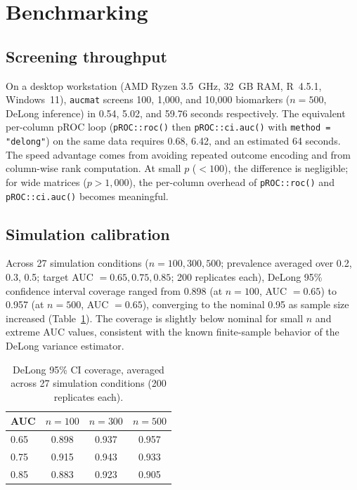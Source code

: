 \documentclass[11pt,a4paper]{article}
\begin{document}
\section{Benchmarking}

\subsection{Screening throughput}

On a desktop workstation (AMD Ryzen 3.5~GHz, 32~GB RAM, R~4.5.1,
Windows~11), \texttt{aucmat} screens 100, 1{,}000, and 10{,}000 biomarkers
($n = 500$, DeLong inference) in 0.54, 5.02, and 59.76 seconds respectively.
The equivalent per-column pROC loop (\texttt{pROC::roc()} then
\texttt{pROC::ci.auc()} with \texttt{method = "delong"}) on the same data
requires 0.68, 6.42, and an estimated 64 seconds.  The speed advantage comes
from avoiding repeated outcome encoding and from column-wise rank computation.
At small $p$ ($<100$), the difference is negligible; for wide matrices
($p > 1{,}000$), the per-column overhead of \texttt{pROC::roc()} and
\texttt{pROC::ci.auc()} becomes meaningful.

\subsection{Simulation calibration}

Across 27 simulation conditions ($n = 100, 300, 500$; prevalence averaged
over 0.2, 0.3, 0.5; target AUC $= 0.65, 0.75, 0.85$; 200 replicates each),
DeLong 95\% confidence interval coverage ranged from 0.898 (at $n = 100$,
AUC $= 0.65$) to 0.957 (at $n = 500$, AUC $= 0.65$), converging to the
nominal 0.95 as sample size increased (Table~\ref{tab:coverage}).  The
coverage is slightly below nominal for small $n$ and extreme AUC values,
consistent with the known finite-sample behavior of the DeLong variance
estimator.

\begin{table}[htbp]
\centering
\caption{DeLong 95\% CI coverage, averaged across 27 simulation conditions
         (200 replicates each).}\label{tab:coverage}
\begin{tabular}{lccc}
\toprule
AUC & $n=100$ & $n=300$ & $n=500$ \\
\midrule
0.65 & 0.898 & 0.937 & 0.957 \\
0.75 & 0.915 & 0.943 & 0.933 \\
0.85 & 0.883 & 0.923 & 0.905 \\
\bottomrule
\end{tabular}
\end{table}
\end{document}
